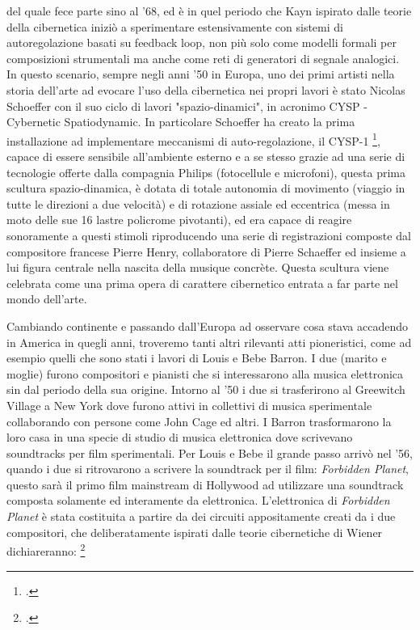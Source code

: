 del quale fece parte sino al '68,
ed è in quel periodo che Kayn ispirato dalle teorie della cibernetica iniziò a sperimentare
estensivamente con sistemi di autoregolazione basati su feedback loop,
non più solo come modelli formali per composizioni strumentali
ma anche come reti di generatori di segnale analogici. \\
In questo scenario, sempre negli anni '50 in Europa, uno dei primi artisti nella storia dell'arte
ad evocare l'uso della cibernetica nei propri lavori è stato
Nicolas Schoeffer con il suo ciclo di lavori "spazio-dinamici", in acronimo
CYSP - Cybernetic Spatiodynamic.
In particolare Schoeffer ha creato la prima installazione ad implementare meccanismi
di auto-regolazione, il CYSP-1 \footcite{sanfilippovallefeedsys},
capace di essere sensibile all'ambiente esterno e a se stesso
grazie ad una serie di tecnologie offerte dalla compagnia Philips (fotocellule e microfoni),
questa prima scultura spazio-dinamica, è dotata di totale autonomia di movimento
(viaggio in tutte le direzioni a due velocità) e di rotazione assiale ed eccentrica
(messa in moto delle sue 16 lastre policrome pivotanti),
ed era capace di reagire sonoramente a questi stimoli riproducendo
una serie di registrazioni composte dal compositore francese Pierre Henry,
collaboratore di Pierre Schaeffer ed insieme a lui figura centrale nella nascita della musique concrète.
Questa scultura viene celebrata come una prima opera di carattere cibernetico 
entrata a far parte nel mondo dell'arte.

Cambiando continente e passando dall'Europa ad osservare cosa stava accadendo
in America in quegli anni, troveremo tanti altri rilevanti atti pioneristici,
come ad esempio quelli che sono stati i lavori di Louis e Bebe Barron.
I due (marito e moglie) furono compositori e pianisti che si
interessarono alla musica elettronica sin dal periodo della sua origine.
Intorno al '50 i due si trasferirono al Greewitch Village a New York
dove furono attivi in collettivi di musica sperimentale
collaborando con persone come John Cage ed altri.
I Barron trasformarono
la loro casa in una specie di studio di musica elettronica
dove scrivevano soundtracks per film sperimentali.
Per Louis e Bebe il grande passo arrivò nel
'56, quando i due si ritrovarono a scrivere la soundtrack per il film:
\textit{Forbidden Planet},
questo sarà il primo film mainstream di Hollywood ad utilizzare una soundtrack
composta solamente ed interamente da elettronica.
L'elettronica di \textit{Forbidden Planet} è stata
costituita a partire da dei circuiti appositamente creati da i due compositori,
che deliberatamente ispirati dalle teorie cibernetiche di Wiener
dichiareranno: \footcite{dunbarlisteningcyb}

